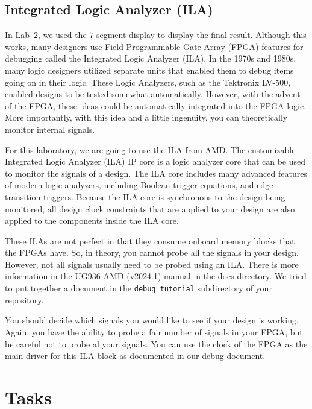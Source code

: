 \documentclass{article}
\begin{document}
\subsection{Integrated Logic Analyzer (ILA)}
\label{ila.sec}

In Lab~$2$, we used the $7$-segment display to display the final
result.  Although this works, many designers use Field Programmable
Gate Array (FPGA) features for debugging called the Integrated Logic
Analyzer (ILA).  In the 1970s and 1980s, many logic designers utilized
separate units that enabled them to debug items going on in their
logic.  These Logic Analyzers, such as the Tektronix LV-500, enabled
designs to be tested somewhat automatically.  However, with the advent
of the FPGA, these ideas could be automatically integrated into the
FPGA logic. More importantly, with this idea and a little ingenuity,
you can theoretically monitor internal signals.

For this laboratory, we are going to use the ILA from AMD.
The customizable Integrated Logic Analyzer (ILA) IP core is a logic
analyzer core that can be used to monitor the signals of a
design. The ILA core includes many advanced features of modern logic
analyzers, including Boolean trigger equations, and edge transition
triggers. Because the ILA core is synchronous to the design being
monitored, all design clock constraints that are applied to your
design are also applied to the components inside the ILA core.

These ILAs are not perfect in that they consume onboard memory blocks
that the FPGAs have.  So, in theory, you cannot probe all the signals
in your design.  However, not all signals usually need to be probed
using an ILA.
There is more information in the UG936 AMD (v2024.1) manual in the
docs directory.  We tried to put together a document in the
\verb!debug_tutorial! subdirectory of your repository.

You should decide which signals you would like to see if your design
is working.  Again,  you have the ability to probe a fair number of
signals in your FPGA, but be careful not to probe al your signals.
You can use the clock of the FPGA as the main driver for this ILA
block as documented in our debug document.

\section{Tasks}
\end{document}
